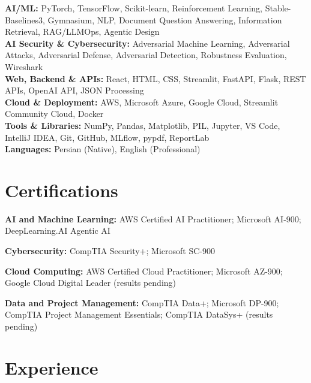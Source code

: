 \documentclass[letterpaper,10pt]{article}
\newenvironment{resume_list}{
  \vspace{-7pt}
  \begin{itemize}[itemsep=-2px, parsep=1pt, leftmargin=30pt]
}{
  \end{itemize}
}
\begin{document}
\textbf{AI/ML:} PyTorch, TensorFlow, Scikit-learn, Reinforcement Learning, Stable-Baselines3, Gymnasium, NLP, Document Question Answering, Information Retrieval, RAG/LLMOps, Agentic Design \\

\textbf{AI Security \& Cybersecurity:} Adversarial Machine Learning, Adversarial Attacks, Adversarial Defense, Adversarial Detection, Robustness Evaluation, Wireshark \\

\textbf{Web, Backend \& APIs:} React, HTML, CSS, Streamlit, FastAPI, Flask, REST APIs, OpenAI API, JSON Processing \\

\textbf{Cloud \& Deployment:} AWS, Microsoft Azure, Google Cloud, Streamlit Community Cloud, Docker \\

\textbf{Tools \& Libraries:} NumPy, Pandas, Matplotlib, PIL, Jupyter, VS Code, IntelliJ IDEA, Git, GitHub, MLflow, pypdf, ReportLab \\

\textbf{Languages:} Persian (Native), English (Professional)







\section{Certifications}

\begin{resume_list}
\item \textbf{AI and Machine Learning:} AWS Certified AI Practitioner; Microsoft AI-900; DeepLearning.AI Agentic AI

\item \textbf{Cybersecurity:} CompTIA Security+; Microsoft SC-900

\item \textbf{Cloud Computing:} AWS Certified Cloud Practitioner; Microsoft AZ-900; Google Cloud Digital Leader (results pending)

\item \textbf{Data and Project Management:} CompTIA Data+; Microsoft DP-900; CompTIA Project Management Essentials; CompTIA DataSys+ (results pending)
\end{resume_list}



\section{Experience}
\end{document}
